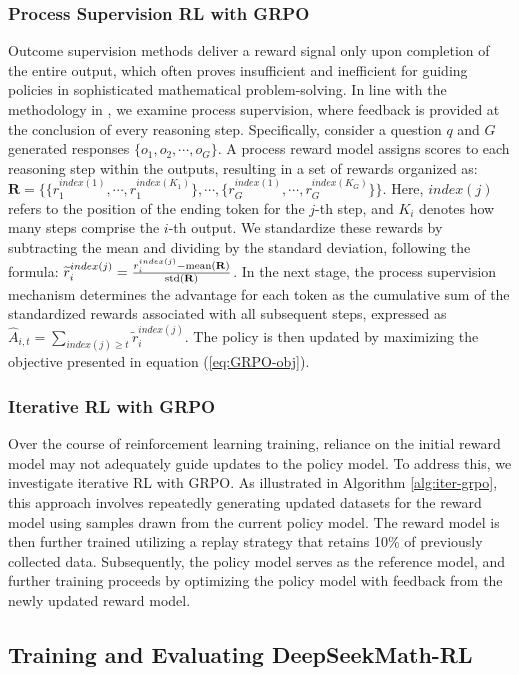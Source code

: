 \begin{itemize}[topsep=0pt]
\subsubsection{Process Supervision RL with GRPO}  
Outcome supervision methods deliver a reward signal only upon completion of the entire output, which often proves insufficient and inefficient for guiding policies in sophisticated mathematical problem-solving. In line with the methodology in \cite{wang2023math}, we examine process supervision, where feedback is provided at the conclusion of every reasoning step. Specifically, consider a question $q$ and $G$ generated responses $\{o_1, o_2, \cdots, o_G\}$. A process reward model assigns scores to each reasoning step within the outputs, resulting in a set of rewards organized as: $\mathbf{R} = \{ \{r_1^{index(1)},\cdots,r_1^{index(K_1)}\}, \cdots,  \{r_G^{index(1)},\cdots,r_G^{index(K_G)}\} \}$. Here, $index(j)$ refers to the position of the ending token for the $j$-th step, and $K_i$ denotes how many steps comprise the $i$-th output. We standardize these rewards by subtracting the mean and dividing by the standard deviation, following the formula: $\widetilde{r}_i^{index(j)} = \frac{r_i^{index(j)} - {\rm mean(\mathbf{R})}}{{\rm std(\mathbf{R})}}$.  
In the next stage, the process supervision mechanism determines the advantage for each token as the cumulative sum of the standardized rewards associated with all subsequent steps, expressed as $\hat{A}_{i, t} = \sum_{index(j) \ge t} \widetilde{r}_i^{index(j)}$. The policy is then updated by maximizing the objective presented in equation (\ref{eq:GRPO-obj}).

\subsubsection{Iterative RL with GRPO} Over the course of reinforcement learning training, reliance on the initial reward model may not adequately guide updates to the policy model. To address this, we investigate iterative RL with GRPO. As illustrated in Algorithm \ref{alg:iter-grpo}, this approach involves repeatedly generating updated datasets for the reward model using samples drawn from the current policy model. The reward model is then further trained utilizing a replay strategy that retains 10\% of previously collected data. Subsequently, the policy model serves as the reference model, and further training proceeds by optimizing the policy model with feedback from the newly updated reward model.

\subsection{Training and Evaluating DeepSeekMath-RL}


\end{itemize}
